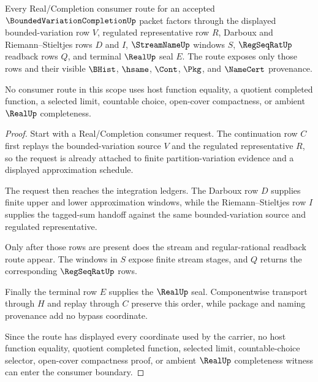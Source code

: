 \begin{theorem}
\label{thm:bounded-variation-completion-real-seal-route}
Every Real/Completion consumer route for an accepted $\BoundedVariationCompletionUp$ packet factors through the displayed bounded-variation row $V$, regulated representative row $R$, Darboux and Riemann--Stieltjes rows $D$ and $I$, $\StreamNameUp$ windows $S$, $\RegSeqRatUp$ readback rows $Q$, and terminal $\RealUp$ seal $E$. The route exposes only those rows and their visible $\BHist$, $\hsame$, $\Cont$, $\Pkg$, and $\NameCert$ provenance.

No consumer route in this scope uses host function equality, a quotient completed function, a selected limit, countable choice, open-cover compactness, or ambient $\RealUp$ completeness.
\end{theorem}
\begin{proof}
Start with a Real/Completion consumer request. The continuation row $C$ first replays the bounded-variation source $V$ and the regulated representative $R$, so the request is already attached to finite partition-variation evidence and a displayed approximation schedule.

The request then reaches the integration ledgers. The Darboux row $D$ supplies finite upper and lower approximation windows, while the Riemann--Stieltjes row $I$ supplies the tagged-sum handoff against the same bounded-variation source and regulated representative.

Only after those rows are present does the stream and regular-rational readback route appear. The windows in $S$ expose finite stream stages, and $Q$ returns the corresponding $\RegSeqRatUp$ rows.

Finally the terminal row $E$ supplies the $\RealUp$ seal. Componentwise transport through $H$ and replay through $C$ preserve this order, while package and naming provenance add no bypass coordinate.

Since the route has displayed every coordinate used by the carrier, no host function equality, quotient completed function, selected limit, countable-choice selector, open-cover compactness proof, or ambient $\RealUp$ completeness witness can enter the consumer boundary.
\end{proof}


